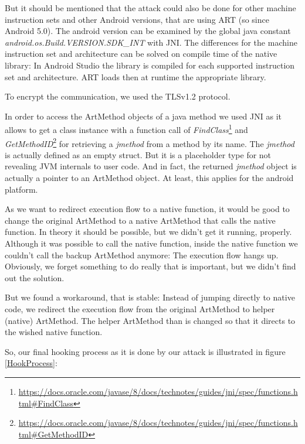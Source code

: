 But it should be mentioned that the attack could also be done for other machine instruction sets and other Android versions, that are using ART (so since Android 5.0). The android version can be examined by the global java constant \emph{android.os.Build.VERSION.SDK\_INT} with JNI.
The differences for the machine instruction set and architecture can be solved on compile time of the native library: In Android Studio the library is compiled for each supported instruction set and architecture. ART loads then at runtime the appropriate library.

To encrypt the communication, we used the TLSv1.2 protocol. 

In order to access the ArtMethod objects of a java method we used JNI as it allows to get a class instance with a function call of  \emph{FindClass}\footnote{\url{https://docs.oracle.com/javase/8/docs/technotes/guides/jni/spec/functions.html\#FindClass}} and \emph{GetMethodID}\footnote{\url{https://docs.oracle.com/javase/8/docs/technotes/guides/jni/spec/functions.html\#GetMethodID}} for retrieving a \emph{jmethod} from a method by its name. The \emph{jmethod} is actually defined as an empty struct. But it is a placeholder type for not revealing JVM internals to user code. And in fact, the returned \emph{jmethod} object is actually a pointer to an ArtMethod object. At least, this applies for the android platform.


As we want to redirect execution flow to a native function, it would be good to change the original ArtMethod to a native ArtMethod that calls the native function. In theory it should be possible, but we didn't get it running, properly. Although it was possible to call the native function, inside the native function we couldn't call the backup ArtMethod anymore: The execution flow hangs up. Obviously, we forget something to do really that is important, but we didn't find out the solution. 

But we found a workaround, that is stable: Instead of jumping directly to native code, we redirect the execution flow from the original ArtMethod to helper (native) ArtMethod. The helper ArtMethod than is changed so that it directs to the wished native function.

So, our final hooking process as it is done by our attack is illustrated in figure \ref{HookProcess}:

